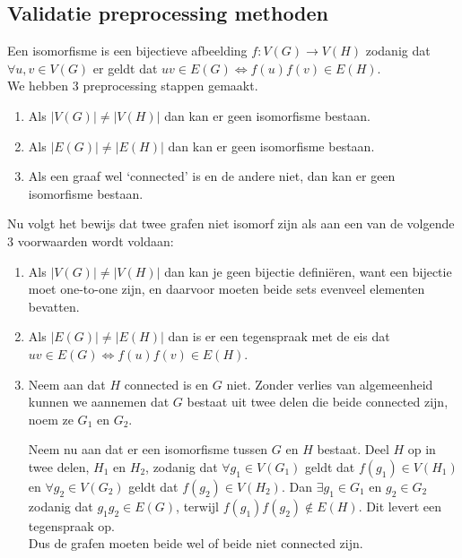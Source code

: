 \documentclass{article}
\begin{document}
\subsection{Validatie preprocessing methoden}

Een isomorfisme is een bijectieve afbeelding $f:V(G) \rightarrow V(H)$ zodanig dat $\forall u,v \in V(G)$ er geldt dat $uv \in E(G) \Leftrightarrow f(u)f(v)\in E(H)$.\\

We hebben 3 preprocessing stappen gemaakt.
\begin{enumerate}
\item Als $|V(G)|\neq|V(H)|$ dan kan er geen isomorfisme bestaan.
\item Als $|E(G)|\neq|E(H)|$ dan kan er geen isomorfisme bestaan.
\item Als een graaf wel `connected' is en de andere niet, dan kan er geen isomorfisme bestaan.
\end{enumerate}

Nu volgt het bewijs dat twee grafen niet isomorf zijn als aan een van de volgende 3 voorwaarden wordt voldaan:
\begin{enumerate}
\item Als $|V(G)|\neq|V(H)|$ dan kan je geen bijectie defini\"eren, want een bijectie moet one-to-one zijn, en daarvoor moeten beide sets evenveel elementen bevatten.
\item Als $|E(G)|\neq|E(H)|$ dan is er een tegenspraak met de eis dat $uv\in E(G)\Leftrightarrow f(u)f(v)\in E(H)$.
\item Neem aan dat $H$ connected is en $G$ niet. Zonder verlies van algemeenheid kunnen we aannemen dat $G$ bestaat uit twee delen die beide connected zijn, noem ze $G_1$ en $G_2$.

Neem nu aan dat er een isomorfisme tussen $G$ en $H$ bestaat. Deel $H$ op in twee delen, $H_1$ en $H_2$, zodanig dat $\forall g_1\in V(G_1)$ geldt dat $f(g_1)\in V(H_1)$ en $\forall g_2\in V(G_2)$ geldt dat $f(g_2)\in V(H_2)$.
Dan $\exists g_1\in G_1$ en $g_2\in G_2$ zodanig dat $g_1g_2\in E(G)$, terwijl $f(g_1)f(g_2)\notin E(H)$. Dit levert een tegenspraak op.\\
Dus de grafen moeten beide wel of beide niet connected zijn.
\end{enumerate}

\pagebreak

\end{document}
